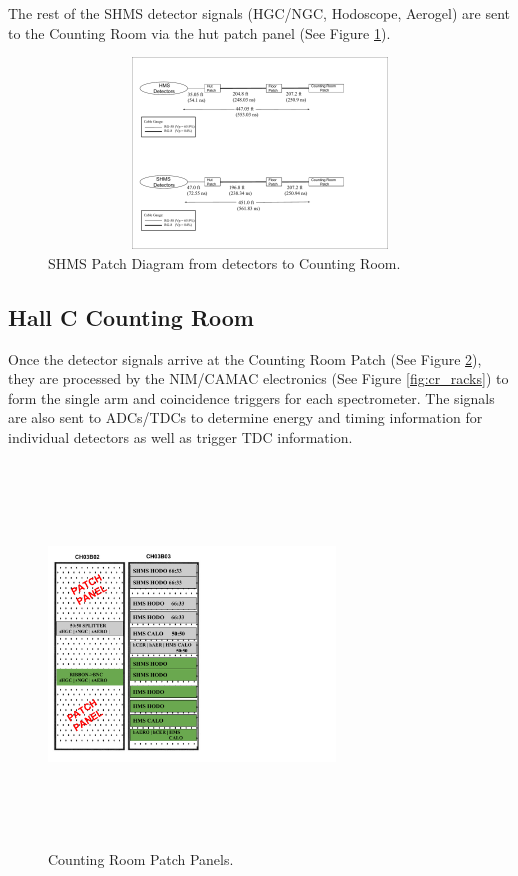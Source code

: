 \documentclass[11pt]{article}
\begin{document}
\newpage
The rest of the SHMS detector signals (HGC/NGC, Hodoscope, Aerogel) are sent to the Counting Room via the hut patch panel (See Figure \ref{fig:shms_patch}). 
\begin{figure}[h!]
  \centering
  \includegraphics[width=6.0in, height=2.0in]{SHMS_patch.pdf}
  \caption{SHMS Patch Diagram from detectors to Counting Room.}
  \label{fig:shms_patch}
\end{figure}

\newpage
\subsection{Hall C Counting Room}
Once the detector signals arrive at the Counting Room Patch (See Figure \ref{fig:cr_patch}), they are processed by the NIM/CAMAC electronics (See Figure \ref{fig:cr_racks}) to form the single arm and coincidence triggers
for each spectrometer. The signals are also sent to ADCs/TDCs to determine energy and timing information for individual detectors as well as trigger TDC information.

\begin{figure}[h!]
  \centering
  \includegraphics[width=3.0in, height=4.0in]{CR_Patch.pdf}
  \caption{Counting Room Patch Panels.}
  \label{fig:cr_patch}
\end{figure}
\end{document}
